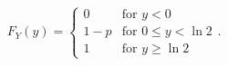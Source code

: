 \begin{exercise}
\begin{solution}
\begin{enumerate}
			\begin{equation*}
				F_Y(y) =
				\begin{cases}
					0 & \text{for } y < 0 \\
					1 - p & \text{for } 0 \leq y < \ln 2 \\
					1 & \text{for } y \geq \ln 2
				\end{cases}.
			\end{equation*}
	\end{enumerate}
	\end{solution}
\end{exercise}

